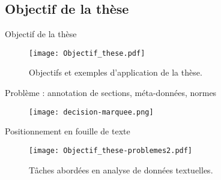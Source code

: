 \subsection{Objectif de la thèse}
\begin{frame}[c]{Objectif de la thèse}
	\begin{figure}[!htb]	
		\texttt{[image: Objectif\_these.pdf]}
		\caption{Objectifs et exemples d'application de la thèse.} \label{fig:intro:objectif-these}
	\end{figure}
\end{frame}

\begin{frame}[c]{Problème : annotation de sections, méta-données, normes}
\begin{figure}
	\texttt{[image: decision-marquee.png]}
\end{figure}
\end{frame}


\begin{frame}[c]{Positionnement en fouille de texte}	
	\begin{figure}[!htb]
		\texttt{[image: Objectif\_these-problemes2.pdf]}
		\caption{Tâches abordées en analyse de données textuelles.} \label{fig:intro:objectif-these-problemes}
	\end{figure}
\end{frame}

